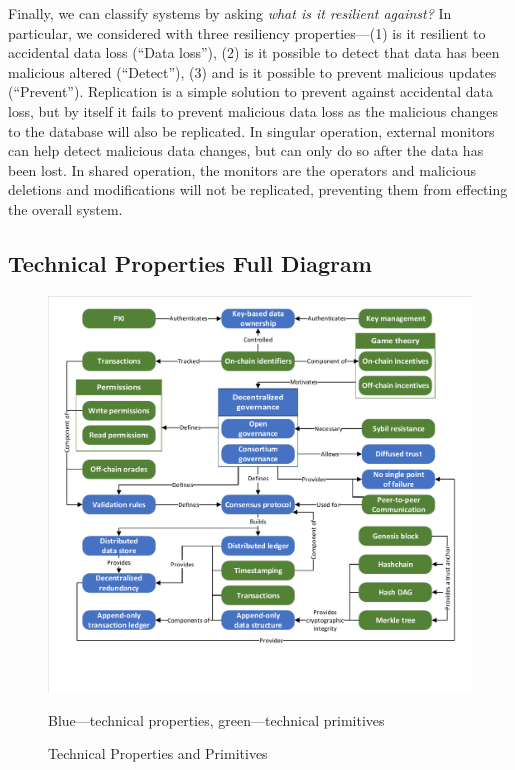 Finally, we can classify systems by asking \emph{what is it resilient against?}
In particular, we considered with three resiliency properties---(1) is it resilient to accidental data loss (``Data loss''), (2) is it possible to detect that data has been malicious altered (``Detect''), (3) and is it possible to prevent malicious updates (``Prevent'').
Replication is a simple solution to prevent against accidental data loss, but by itself it fails to prevent malicious data loss as the malicious changes to the database will also be replicated.
In singular operation, external monitors can help detect malicious data changes, but can only do so after the data has been lost.
In shared operation, the monitors are the operators and malicious deletions and modifications will not be replicated, preventing them from effecting the overall system.




\subsection{Technical Properties Full Diagram}


\begin{figure}[h]
	\centering
	\includegraphics[page=1,width=\columnwidth]{figures/grounded-theory-main}
	
	{\small Blue---technical properties, green---technical primitives}
	\caption{Technical Properties and Primitives}
	\label{fig:technical-properties-full}
\end{figure}
